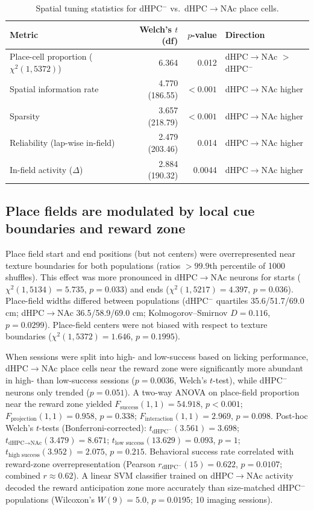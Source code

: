 \documentclass[10pt,a4paper]{article}
\begin{document}
\begin{table}[h]
\centering
\caption{Spatial tuning statistics for dHPC$^{-}$ vs.\ dHPC$\rightarrow$NAc place cells.}
\label{tab:place_cells}
\begin{tabular}{lrrl}
\toprule
Metric & Welch's $t$ (df) & $p$-value & Direction \\
\midrule
Place-cell proportion ($\chi^2(1,5372)$) & 6.364 & 0.012 & dHPC$\rightarrow$NAc $>$ dHPC$^{-}$ \\
Spatial information rate & 4.770 (186.55) & $<0.001$ & dHPC$\rightarrow$NAc higher \\
Sparsity & 3.657 (218.79) & $<0.001$ & dHPC$\rightarrow$NAc higher \\
Reliability (lap-wise in-field) & 2.479 (203.46) & 0.014 & dHPC$\rightarrow$NAc higher \\
In-field activity ($\Delta$) & 2.884 (190.32) & 0.0044 & dHPC$\rightarrow$NAc higher \\
\bottomrule
\end{tabular}
\end{table}

\subsection{Place fields are modulated by local cue boundaries and reward zone}
Place field start and end positions (but not centers) were overrepresented near texture boundaries for both populations (ratios $>99.9$th percentile of 1000 shuffles). This effect was more pronounced in dHPC$\rightarrow$NAc neurons for starts ($\chi^2(1,5134)=5.735$, $p=0.033$) and ends ($\chi^2(1,5217)=4.397$, $p=0.036$). Place-field widths differed between populations (dHPC$^{-}$ quartiles 35.6/51.7/69.0 cm; dHPC$\rightarrow$NAc 36.5/58.9/69.0 cm; Kolmogorov--Smirnov $D=0.116$, $p=0.0299$). Place-field centers were not biased with respect to texture boundaries ($\chi^2(1,5372)=1.646$, $p=0.1995$).

When sessions were split into high- and low-success based on licking performance, dHPC$\rightarrow$NAc place cells near the reward zone were significantly more abundant in high- than low-success sessions ($p=0.0036$, Welch's $t$-test), while dHPC$^{-}$ neurons only trended ($p=0.051$). A two-way ANOVA on place-field proportion near the reward zone yielded $F_{\text{success}}(1,1)=54.918$, $p<0.001$; $F_{\text{projection}}(1,1)=0.958$, $p=0.338$; $F_{\text{interaction}}(1,1)=2.969$, $p=0.098$. Post-hoc Welch's $t$-tests (Bonferroni-corrected): $t_{\text{dHPC}^{-}}(3.561)=3.698$; $t_{\text{dHPC}\rightarrow\text{NAc}}(3.479)=8.671$; $t_{\text{low success}}(13.629)=0.093$, $p=1$; $t_{\text{high success}}(3.952)=2.075$, $p=0.215$. Behavioral success rate correlated with reward-zone overrepresentation (Pearson $r_{\text{dHPC}^{-}}(15)=0.622$, $p=0.0107$; combined $r\approx0.62$). A linear SVM classifier trained on dHPC$\rightarrow$NAc activity decoded the reward anticipation zone more accurately than size-matched dHPC$^{-}$ populations (Wilcoxon's $W(9)=5.0$, $p=0.0195$; 10 imaging sessions).
\end{document}
